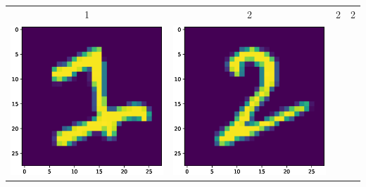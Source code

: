 \documentclass{article}
\begin{document}
\begin{tabular}{cccc}
1 & 2 & 2 &2 \\ 

\includegraphics[scale=.1]{fig/MNIST_947_1_0_947_1.eps}&
\includegraphics[scale=.1]{fig/MNIST_947_1_1_913_2.eps}&

\end{tabular}
\end{document}
